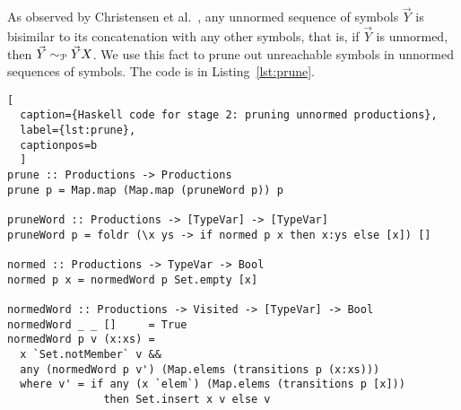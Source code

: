 
As observed by Christensen et
al.~\cite{DBLP:journals/iandc/ChristensenHS95}, any unnormed sequence
of symbols $\vec Y$ is bisimilar to its concatenation with any other
symbols, that is, if $\vec Y$ is unnormed, then
$\vec Y \sim_\mathcal P \vec YX$.
%
%
We use this fact
to prune out unreachable symbols in unnormed sequences of symbols. The
code is in Listing~\ref{lst:prune}.
%

\begin{lstlisting}[
  caption={Haskell code for stage 2: pruning unnormed productions},
  label={lst:prune},
  captionpos=b
  ]
prune :: Productions -> Productions
prune p = Map.map (Map.map (pruneWord p)) p

pruneWord :: Productions -> [TypeVar] -> [TypeVar]
pruneWord p = foldr (\x ys -> if normed p x then x:ys else [x]) []

normed :: Productions -> TypeVar -> Bool
normed p x = normedWord p Set.empty [x]

normedWord :: Productions -> Visited -> [TypeVar] -> Bool
normedWord _ _ []     = True
normedWord p v (x:xs) =
  x `Set.notMember` v &&
  any (normedWord p v') (Map.elems (transitions p (x:xs)))
  where v' = if any (x `elem`) (Map.elems (transitions p [x]))
               then Set.insert x v else v
\end{lstlisting}

